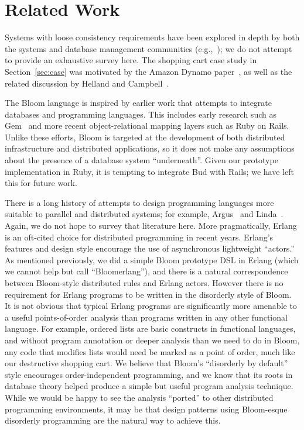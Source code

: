 \section{Related Work}
\label{sec:relwork}
Systems with loose consistency requirements have
been explored in depth by both the systems and database management communities
(e.g.,~\cite{sagas,leases,dangers,bayou}); we do not attempt to provide
an exhaustive survey here.  The shopping cart case study in Section~\ref{sec:case} was motivated by the
Amazon Dynamo paper~\cite{dynamo}, as well as the related discussion by Helland
and Campbell~\cite{quicksand}. 

The Bloom language is inspired by earlier work that attempts to integrate
databases and programming languages.  This includes early research such as
Gem~\cite{gem} and more recent object-relational mapping layers such as Ruby on
Rails.  Unlike these efforts, Bloom is targeted at the development of both
distributed infrastructure and distributed applications, so it does not make any
assumptions about the presence of a database system ``underneath''.  Given
our prototype implementation in Ruby, it is tempting to integrate Bud with
Rails; we have left this for future work.

There is a long history of attempts to design programming languages more
suitable to parallel and distributed systems; for example, Argus~\cite{argus}
and Linda~\cite{linda}.  Again, we do not hope to survey that literature here.
More pragmatically, Erlang is an oft-cited choice for distributed programming in
recent years.  Erlang's features and design style encourage the use of
asynchronous lightweight ``actors.''  As mentioned previously, we did a simple
Bloom prototype DSL in Erlang (which we cannot help but call ``Bloomerlang''),
and there is a natural correspondence between Bloom-style distributed rules and
Erlang actors.  However there is no requirement for Erlang programs to be
written in the disorderly style of Bloom. It is not obvious that typical Erlang
programs are significantly more amenable to a useful points-of-order analysis
than programs written in any other functional language.  For example, ordered
lists are basic constructs in functional languages, and without program
annotation or deeper analysis than we need to do in Bloom, any code that
modifies lists would need be marked as a point of order, much like our
destructive shopping cart.  We believe that Bloom's ``disorderly by default''
style encourages order-independent programming, and we know that its roots in
database theory helped produce a simple but useful program analysis
technique. While we would be happy to see the analysis ``ported'' to other
distributed programming environments, it may be that design patterns using
Bloom-esque disorderly programming are the natural way to achieve this.

